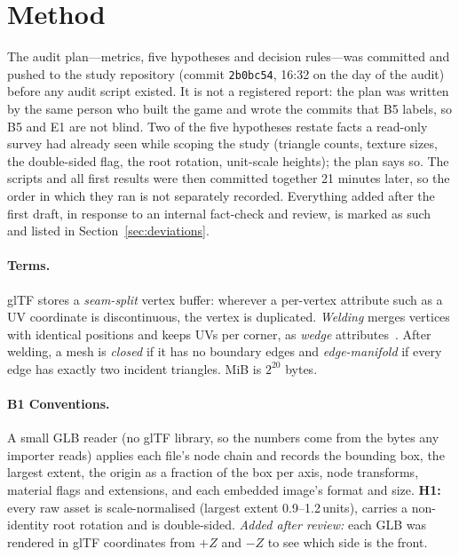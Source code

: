 \section{Method}
\label{sec:method}

The audit plan---metrics, five hypotheses and decision rules---was committed and
pushed to the study repository (commit \texttt{2b0bc54}, 16:32 on the day of the
audit) before any audit script existed. It is not a registered report: the plan
was written by the same person who built the game and wrote the commits that B5
labels, so B5 and E1 are not blind. Two of the five hypotheses restate facts a
read-only survey had already seen while scoping the study (triangle counts,
texture sizes, the double-sided flag, the root rotation, unit-scale heights);
the plan says so. The scripts and all first results were then committed together
21 minutes later, so the order in which they ran is not separately recorded.
Everything added after the first draft, in response to an internal fact-check and
review, is marked as such and listed in Section~\ref{sec:deviations}.

\paragraph{Terms.} glTF stores a \emph{seam-split} vertex buffer: wherever a
per-vertex attribute such as a UV coordinate is discontinuous, the vertex is
duplicated. \emph{Welding} merges vertices with identical positions and keeps
UVs per corner, as \emph{wedge} attributes~\cite{hoppe1999newqem}. After welding,
a mesh is \emph{closed} if it has no boundary edges and \emph{edge-manifold} if
every edge has exactly two incident triangles. MiB is $2^{20}$ bytes.

\paragraph{B1 Conventions.} A small GLB reader (no glTF library, so the numbers
come from the bytes any importer reads) applies each file's node chain and
records the bounding box, the largest extent, the origin as a fraction of the box
per axis, node transforms, material flags and extensions, and each embedded
image's format and size. \textbf{H1:} every raw asset is scale-normalised (largest
extent 0.9--1.2\,units), carries a non-identity root rotation and is
double-sided. \emph{Added after review:} each GLB was rendered in glTF
coordinates from $+Z$ and $-Z$ to see which side is the front.

